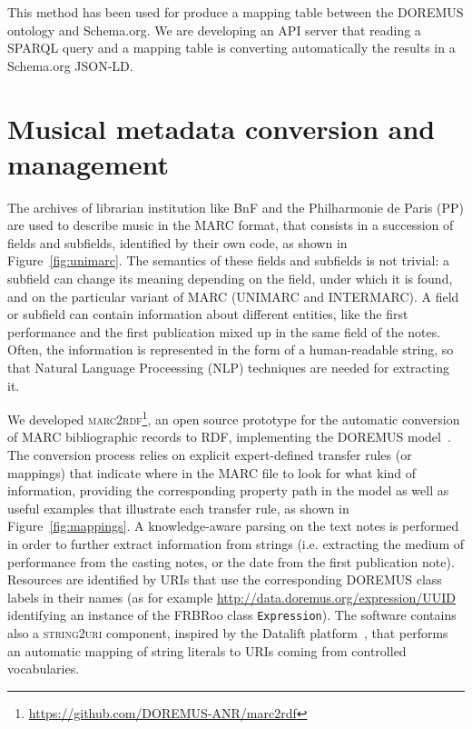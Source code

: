 \documentclass[a4paper,11pt]{report}
\newcommand\figref{Figure~\ref}
\begin{document}
This method has been used for produce a mapping table between the DOREMUS ontology and Schema.org. We are developing an API server that reading a SPARQL query and a mapping table is converting automatically the results in a Schema.org JSON-LD.

\section{Musical metadata conversion and management} \label{conversion}

The archives of librarian institution like BnF and the Philharmonie de Paris (PP) are used to describe music in the MARC format, that consists in a succession of fields and subfields, identified by their own code, as shown in \figref{fig:unimarc}. The semantics of these fields and subfields is not trivial: a subfield can change its meaning depending on the field, under which it is found, and on the particular variant of MARC (UNIMARC and INTERMARC). A field or subfield can contain information about different entities, like the first performance and the first publication mixed up in the same field of the notes. Often, the information is represented in the form of a human-readable string, so that Natural Language Proceessing (NLP) techniques are needed for extracting it.

We developed \textsc{marc2rdf}\footnote{\url{https://github.com/DOREMUS-ANR/marc2rdf}}, an open source prototype for the automatic conversion of MARC bibliographic records to RDF, implementing the DOREMUS model~\cite{lisena2016exploring}. The conversion process relies on explicit expert-defined transfer rules (or mappings) that indicate where in the MARC file to look for what kind of information, providing the corresponding property path in the model as well as useful examples that illustrate each transfer rule, as shown in \figref{fig:mappings}. A knowledge-aware parsing on the text notes is performed in order to further extract information from strings (i.e. extracting the medium of performance from the casting notes, or the date from the first publication note). Resources are identified by URIs that use the corresponding DOREMUS class labels in their names (as for example \url{http://data.doremus.org/expression/UUID} identifying an instance of the FRBRoo class \texttt{Expression}). The software contains also a \textsc{string2uri} component, inspired by the Datalift platform~\cite{scharffe2012enabling}, that performs an automatic mapping of string literals to URIs coming from controlled vocabularies.
\end{document}
